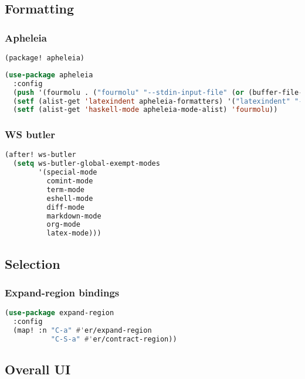 \documentclass[11pt]{article}
\begin{document}
\subsection{Formatting}
\label{sec:formatting}


\subsubsection{Apheleia}
\label{sec:apheleia}
\begin{lstlisting}[language=Lisp]
(package! apheleia)
\end{lstlisting}

\begin{lstlisting}[language=Lisp]
(use-package apheleia
  :config
  (push '(fourmolu . ("fourmolu" "--stdin-input-file" (or (buffer-file-name) (buffer-name)))) apheleia-formatters)
  (setf (alist-get 'latexindent apheleia-formatters) '("latexindent" "-y=defaultIndent:'  '" "--logfile=/dev/null"))
  (setf (alist-get 'haskell-mode apheleia-mode-alist) 'fourmolu))
\end{lstlisting}

\subsubsection{WS butler}
\label{sec:ws-butler}
\begin{lstlisting}[language=Lisp]
(after! ws-butler
  (setq ws-butler-global-exempt-modes
        '(special-mode
          comint-mode
          term-mode
          eshell-mode
          diff-mode
          markdown-mode
          org-mode
          latex-mode)))
\end{lstlisting}


\subsection{Selection}
\label{sec:selection}


\subsubsection{Expand-region\hfill{} bindings}
\label{sec:expand-region}
\begin{lstlisting}[language=Lisp]
(use-package expand-region
  :config
  (map! :n "C-a" #'er/expand-region
           "C-S-a" #'er/contract-region))
\end{lstlisting}


\subsection{Overall UI}
\label{sec:overall-ui}
\end{document}
